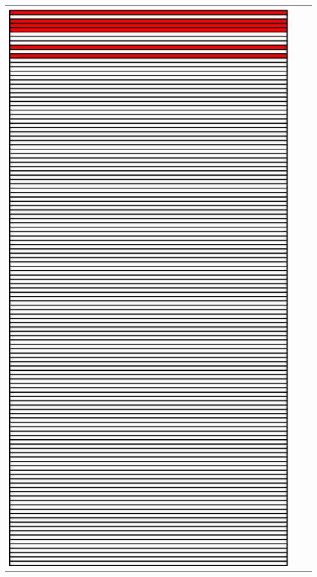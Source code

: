 \documentclass[xcolor={dvipsnames,svgnames},hyperref=dvips]{beamer}
\begin{document}
\begin{frame}
\begin{tabular}{c c c}
		\protect \includegraphics[scale=0.30]{images/fingerprint_btrfs.ps} \\
		\end{tabular}
	\end{frame}
\end{document}
